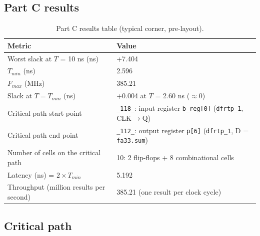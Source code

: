 \documentclass[10pt,a4paper,twocolumn]{article}
\newcommand{\cell}[1]{\texttt{#1}}
\begin{document}
\subsection{Part C results}

\begin{table}[!htbp]
\centering
\begin{tabularx}{\columnwidth}{lY}
\toprule
\textbf{Metric} & \textbf{Value} \\
\midrule
Worst slack at $T$ = 10 ns (ns) & +7.404 \\
$T_{min}$ (ns) & 2.596 \\
$F_{max}$ (MHz) & 385.21 \\
Slack at $T = T_{min}$ (ns) & +0.004 at $T$ = 2.60 ns ($\approx 0$) \\
Critical path start point & \texttt{\_118\_}: input register \texttt{b\_reg[0]} (\cell{dfrtp\_1}, CLK$\rightarrow$Q) \\
Critical path end point & \texttt{\_112\_}: output register \texttt{p[6]} (\cell{dfrtp\_1}, D = \texttt{fa33.sum}) \\
Number of cells on the critical path & 10: 2 flip-flops + 8 combinational cells \\
Latency (ns) = $2 \times T_{min}$ & 5.192 \\
Throughput (million results per second) & 385.21 (one result per clock cycle) \\
\bottomrule
\end{tabularx}
\caption{Part C results table (typical corner, pre-layout).}
\end{table}

\subsection{Critical path}
\end{document}
